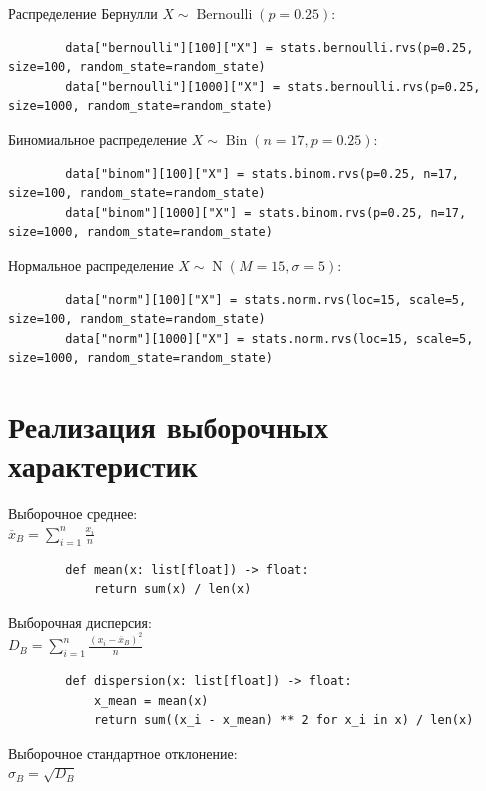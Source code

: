 \documentclass[a4paper,14pt]{extarticle}
\DeclareMathOperator{\Bernoulli}{Bernoulli}
\DeclareMathOperator{\Bin}{Bin}
\DeclareMathOperator{\N}{N}
\begin{document}
    Распределение Бернулли $X \sim \Bernoulli(p = 0.25)$:
    \begin{verbatim}
        data["bernoulli"][100]["X"] = stats.bernoulli.rvs(p=0.25, size=100, random_state=random_state)
        data["bernoulli"][1000]["X"] = stats.bernoulli.rvs(p=0.25, size=1000, random_state=random_state)
    \end{verbatim}

    Биномиальное распределение $X \sim \Bin(n = 17, p = 0.25)$:
    \begin{verbatim}
        data["binom"][100]["X"] = stats.binom.rvs(p=0.25, n=17, size=100, random_state=random_state)
        data["binom"][1000]["X"] = stats.binom.rvs(p=0.25, n=17, size=1000, random_state=random_state)
    \end{verbatim}

    Нормальное распределение $X \sim \N(M = 15, \sigma = 5)$:
    \begin{verbatim}
        data["norm"][100]["X"] = stats.norm.rvs(loc=15, scale=5, size=100, random_state=random_state)
        data["norm"][1000]["X"] = stats.norm.rvs(loc=15, scale=5, size=1000, random_state=random_state)
    \end{verbatim}

    \section{Реализация выборочных характеристик}

    Выборочное среднее:\\
    $\displaystyle \overline{x}_B = \sum_{i = 1}^{n} \frac{x_i}{n}$

    \begin{verbatim}
        def mean(x: list[float]) -> float:
            return sum(x) / len(x)
    \end{verbatim}

    Выборочная дисперсия:\\
    $\displaystyle D_B = \sum_{i = 1}^{n} \frac{(x_i - \overline{x}_B)^2}{n}$

    \begin{verbatim}
        def dispersion(x: list[float]) -> float:
            x_mean = mean(x)
            return sum((x_i - x_mean) ** 2 for x_i in x) / len(x)
    \end{verbatim}

    Выборочное стандартное отклонение:\\
    $\displaystyle \sigma_B = \sqrt{D_B}$
\end{document}
